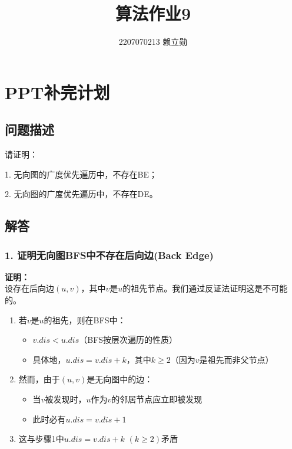 \documentclass{article}
\begin{document}
\title{算法作业9}
\author{2207070213 赖立勋} %
\maketitle

\section{PPT补完计划}
\subsection{问题描述}

请证明：

1. 无向图的广度优先遍历中，不存在BE；

2. 无向图的广度优先遍历中，不存在DE。

\subsection{解答}

\subsubsection{1. 证明无向图BFS中不存在后向边(Back Edge)}

\noindent\textbf{证明：}\\
设存在后向边$(u,v)$，其中$v$是$u$的祖先节点。我们通过反证法证明这是不可能的。

\begin{enumerate}
    \item 若$v$是$u$的祖先，则在BFS中：
    \begin{itemize}
        \item $v.dis < u.dis$（BFS按层次遍历的性质）
        \item 具体地，$u.dis = v.dis + k$，其中$k \geq 2$（因为$v$是祖先而非父节点）
    \end{itemize}
    
    \item 然而，由于$(u,v)$是无向图中的边：
    \begin{itemize}
        \item 当$v$被发现时，$u$作为$v$的邻居节点应立即被发现
        \item 此时必有$u.dis = v.dis + 1$
    \end{itemize}
    
    \item 这与步骤1中$u.dis = v.dis + k$ $(k \geq 2)$矛盾
\end{enumerate}
\end{document}
